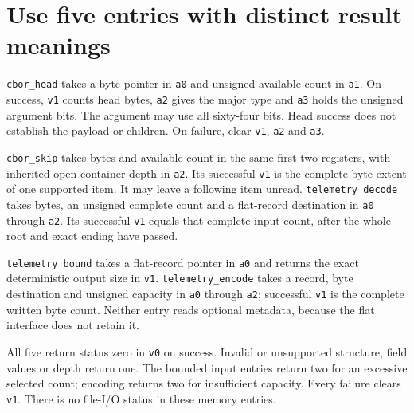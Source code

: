 \section{Use five entries with distinct result meanings}
\texttt{cbor\_head} takes a byte pointer in \texttt{a0} and unsigned available count in
\texttt{a1}. On success, \texttt{v1} counts head bytes, \texttt{a2} gives the major type
and \texttt{a3} holds the unsigned argument bits. The argument may use all sixty-four
bits. Head success does not establish the payload or children. On failure, clear
\texttt{v1}, \texttt{a2} and \texttt{a3}.

\texttt{cbor\_skip} takes bytes and available count in the same first two registers,
with inherited open-container depth in \texttt{a2}. Its successful \texttt{v1} is the
complete byte extent of one supported item. It may leave a following item unread.
\texttt{telemetry\_decode} takes bytes, an unsigned complete count and a flat-record
destination in \texttt{a0} through \texttt{a2}. Its successful \texttt{v1} equals that
complete input count, after the whole root and exact ending have passed.

\texttt{telemetry\_bound} takes a flat-record pointer in \texttt{a0} and returns the
exact deterministic output size in \texttt{v1}. \texttt{telemetry\_encode} takes a record,
byte destination and unsigned capacity in \texttt{a0} through \texttt{a2}; successful
\texttt{v1} is the complete written byte count. Neither entry reads optional metadata,
because the flat interface does not retain it.

All five return status zero in \texttt{v0} on success. Invalid or unsupported structure,
field values or depth return one. The bounded input entries return two for an excessive
selected count; encoding returns two for insufficient capacity. Every failure clears
\texttt{v1}. There is no file-I/O status in these memory entries.
